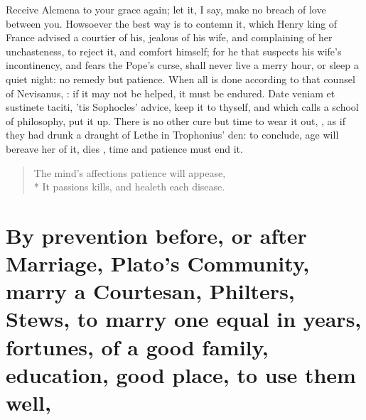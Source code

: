 Receive Alcmena to your grace again; let it, I say, make no breach of
love between you. Howsoever the best way is to contemn it, which
Henry  king of France advised a courtier of his, jealous of
his wife, and complaining of her unchasteness, to reject it, and
comfort himself; for he that suspects his wife's incontinency, and
fears the Pope's curse, shall never live a merry hour, or sleep a quiet
night: no remedy but patience. When all is done according to that
counsel of Nevisanus, : if it may not be helped, it must be endured. Date veniam
et sustinete taciti, 'tis Sophocles' advice, keep it to thyself, and
which \Chrysostom{} calls 
a school of philosophy, put it up. There is no other cure but time to
wear it out, , as if they had drunk a
draught of Lethe in Trophonius' den: to conclude, age will bereave her
of it, dies , time and patience must end it.
%
\begin{verse}%
The mind's affections patience will appease,\\*
It passions kills, and healeth each disease.
\end{verse}%

\section[By prevention before or after Marriage]{By prevention before, or after Marriage, Plato's Community, marry a Courtesan, Philters, Stews, to marry one equal in years, fortunes, of a good family, education, good place, to use them well, \etc{}}

